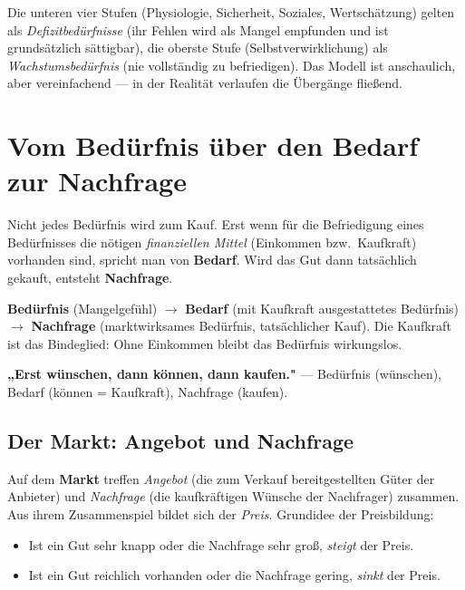 \documentclass[11pt, a4paper]{article}
\begin{document}
Die unteren vier Stufen (Physiologie, Sicherheit, Soziales, Wertschätzung) gelten als
\emph{Defizitbedürfnisse} (ihr Fehlen wird als Mangel empfunden und ist grundsätzlich
sättigbar), die oberste Stufe (Selbstverwirklichung) als \emph{Wachstumsbedürfnis}
(nie vollständig zu befriedigen). Das Modell ist anschaulich, aber vereinfachend ---
in der Realität verlaufen die Übergänge fließend.

\section{Vom Bedürfnis über den Bedarf zur Nachfrage}

Nicht jedes Bedürfnis wird zum Kauf. Erst wenn für die Befriedigung eines Bedürfnisses die
nötigen \emph{finanziellen Mittel} (Einkommen bzw.\ Kaufkraft) vorhanden sind, spricht man
von \textbf{Bedarf}. Wird das Gut dann tatsächlich gekauft, entsteht \textbf{Nachfrage}.

\begin{merksatz}
\textbf{Bedürfnis} (Mangelgefühl) $\rightarrow$ \textbf{Bedarf} (mit Kaufkraft ausgestattetes
Bedürfnis) $\rightarrow$ \textbf{Nachfrage} (marktwirksames Bedürfnis, tatsächlicher Kauf).
Die Kaufkraft ist das Bindeglied: Ohne Einkommen bleibt das Bedürfnis wirkungslos.
\end{merksatz}

\begin{eselsbruecke}
\textbf{„Erst wünschen, dann können, dann kaufen."} --- Bedürfnis (wünschen),
Bedarf (können = Kaufkraft), Nachfrage (kaufen).
\end{eselsbruecke}

\subsection{Der Markt: Angebot und Nachfrage}

Auf dem \textbf{Markt} treffen \emph{Angebot} (die zum Verkauf bereitgestellten Güter der
Anbieter) und \emph{Nachfrage} (die kaufkräftigen Wünsche der Nachfrager) zusammen. Aus
ihrem Zusammenspiel bildet sich der \emph{Preis}. Grundidee der Preisbildung:

\begin{itemize}
  \item Ist ein Gut sehr knapp oder die Nachfrage sehr groß, \emph{steigt} der Preis.
  \item Ist ein Gut reichlich vorhanden oder die Nachfrage gering, \emph{sinkt} der Preis.
\end{itemize}
\end{document}
